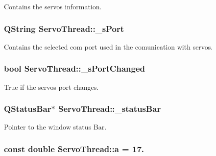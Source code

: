 Contains the servos information. 

\hypertarget{class_servo_thread_ac9a614aa1518efb49b0a06636bd1bdbf}{}
\subsubsection[{\+\_\+s\+Port}]{\setlength{\rightskip}{0pt plus 5cm}Q\+String Servo\+Thread\+::\+\_\+s\+Port\hspace{0.3cm}{\ttfamily [private]}}\label{class_servo_thread_ac9a614aa1518efb49b0a06636bd1bdbf}


Contains the selected com port used in the comunication with servos. 

\hypertarget{class_servo_thread_a6e803432db01b10ed975132315280fd3}{}
\subsubsection[{\+\_\+s\+Port\+Changed}]{\setlength{\rightskip}{0pt plus 5cm}bool Servo\+Thread\+::\+\_\+s\+Port\+Changed\hspace{0.3cm}{\ttfamily [private]}}\label{class_servo_thread_a6e803432db01b10ed975132315280fd3}


True if the servos port changes. 

\hypertarget{class_servo_thread_ab03428f82ff9343dbbca155a91908c0a}{}
\subsubsection[{\+\_\+status\+Bar}]{\setlength{\rightskip}{0pt plus 5cm}Q\+Status\+Bar$\ast$ Servo\+Thread\+::\+\_\+status\+Bar\hspace{0.3cm}{\ttfamily [private]}}\label{class_servo_thread_ab03428f82ff9343dbbca155a91908c0a}


Pointer to the window status Bar. 

\hypertarget{class_servo_thread_a7dc3998d380d61406fe4485f9872edff}{}
\subsubsection[{a}]{\setlength{\rightskip}{0pt plus 5cm}const double Servo\+Thread\+::a = 17.\hspace{0.3cm}{\ttfamily [private]}}\label{class_servo_thread_a7dc3998d380d61406fe4485f9872edff}


